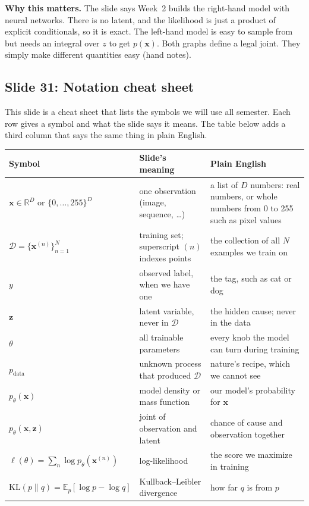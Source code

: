 \textbf{Why this matters.} The slide says Week~2 builds the right-hand model with neural networks. There is no latent, and the likelihood is just a product of explicit conditionals, so it is exact. The left-hand model is easy to sample from but needs an integral over $z$ to get $p(\mathbf{x})$. Both graphs define a legal joint. They simply make different quantities easy (hand notes).

\clearpage
\subsection*{Slide 31: Notation cheat sheet}

This slide is a cheat sheet that lists the symbols we will use all semester. Each row gives a symbol and what the slide says it means. The table below adds a third column that says the same thing in plain English.

\begin{center}
\begin{tabular}{p{}p{}p{}}
\toprule
Symbol & Slide's meaning & Plain English \\
\midrule
$\mathbf{x}\in\mathbb{R}^D$ or $\{0,\dots,255\}^D$ & one observation (image, sequence, \dots) & a list of $D$ numbers: real numbers, or whole numbers from 0 to 255 such as pixel values \\ \addlinespace
$\mathcal{D}=\{\mathbf{x}^{(n)}\}_{n=1}^{N}$ & training set; superscript $(n)$ indexes points & the collection of all $N$ examples we train on \\ \addlinespace
$y$ & observed label, when we have one & the tag, such as cat or dog \\ \addlinespace
$\mathbf{z}$ & latent variable, never in $\mathcal{D}$ & the hidden cause; never in the data \\ \addlinespace
$\theta$ & all trainable parameters & every knob the model can turn during training \\ \addlinespace
$p_{\text{data}}$ & unknown process that produced $\mathcal{D}$ & nature's recipe, which we cannot see \\ \addlinespace
$p_\theta(\mathbf{x})$ & model density or mass function & our model's probability for $\mathbf{x}$ \\ \addlinespace
$p_\theta(\mathbf{x},\mathbf{z})$ & joint of observation and latent & chance of cause and observation together \\ \addlinespace
$\ell(\theta)=\sum_n\log p_\theta(\mathbf{x}^{(n)})$ & log-likelihood & the score we maximize in training \\ \addlinespace
$\mathrm{KL}(p\|q)=\mathbb{E}_p[\log p-\log q]$ & Kullback--Leibler divergence & how far $q$ is from $p$ \\
\bottomrule
\end{tabular}
\end{center}

